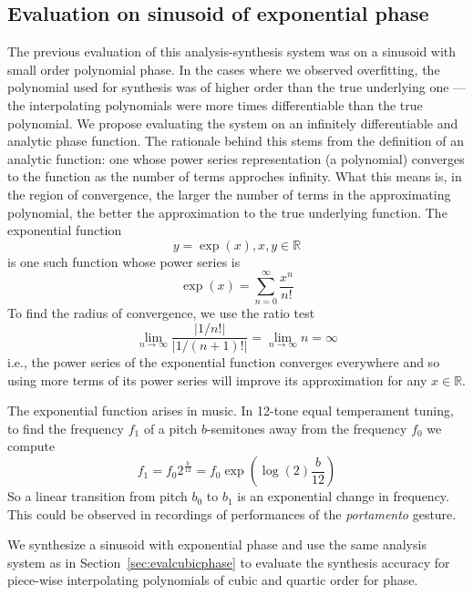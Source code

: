 \subsection{Evaluation on sinusoid of exponential phase \label{sec:evalexpphase}}

The previous evaluation of this analysis-synthesis system was on a sinusoid with
small order polynomial phase. In the cases where we observed overfitting, the
polynomial used for synthesis was of higher order than the true underlying one
--- the interpolating polynomials were more times differentiable than the true
polynomial. We propose evaluating the system on an infinitely differentiable and
analytic phase function. The rationale behind this stems from the definition of
an analytic function: one whose power series representation (a polynomial)
converges to the function as the number of terms approches infinity. What this
means is, in the region of convergence, the larger the number of terms in the
approximating polynomial, the better the approximation to the true underlying
function. The exponential function
\[
    y=\exp(x), x,y \in \mathbb{R}
\]
is one such function whose power series is
\[
    \exp(x)=\sum_{n=0}^{\infty} \frac{x^{n}}{n!}
\]
To find the radius of convergence, we use the ratio test
\[
    \lim_{n \rightarrow \infty} \frac{|1/n!|}{|1/(n+1)!|} = \lim_{n \rightarrow \infty} n = \infty
\]
i.e., the power series of the exponential function converges everywhere and so
using more terms of its power series will improve its approximation for
any $x \in \mathbb{R}$.

The exponential function arises in music. In 12-tone equal temperament tuning,
to find the frequency $f_{1}$ of a pitch $b$-semitones away from the frequency
$f_{0}$ we compute
\[
    f_{1}=f_{0}2^{\frac{b}{12}}=f_{0}\exp(\log(2)\frac{b}{12})
\]
So a linear transition from pitch $b_{0}$ to $b_{1}$ is an exponential change in
frequency. This could be observed in recordings of performances of the
\textit{portamento} gesture.

We synthesize a sinusoid with exponential phase and use the same analysis system
as in Section~\ref{sec:evalcubicphase} to evaluate the synthesis accuracy for
piece-wise interpolating polynomials of cubic and quartic order for phase.

